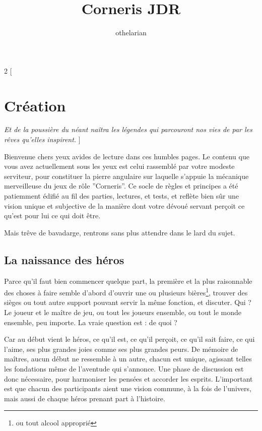 \documentclass[11pt,oneside]{book}
\title{Corneris JDR}
\author{othelarian}
\date{}
\begin{document}
\maketitle

\tableofcontents

\begin{multicols}{2}
[    
    \chapter{Création}
    \emph{Et de la poussière du néant naîtra les légendes qui parcouront nos vies de par les rêves qu'elles inspirent.}
]

Bienvenue chers yeux avides de lecture dans ces humbles pages. Le contenu que vous avez actuellement sous les yeux est celui rassemblé par votre modeste serviteur, pour constituer la pierre angulaire sur laquelle s'appuie la mécanique merveilleuse du jeux de rôle ''Corneris''. Ce socle de règles et principes a été patiemment édifié au fil des parties, lectures, et tests, et reflète bien sûr une vision unique et subjective de la manière dont votre dévoué servant perçoit ce qu'est pour lui ce qui doit être.

Mais trêve de bavadarge, rentrons sans plus attendre dans le lard du sujet.

\section{La naissance des héros}

Parce qu'il faut bien commencer quelque part, la première et la plus raisonnable des choses à faire semble d'abord d'ouvrir une ou plusieurs bières\footnote{ou tout alcool approprié}, trouver des sièges ou tout autre support pouvant servir la même fonction, et discuter. Qui ? Le joueur et le maître de jeu, ou tout les joueurs ensemble, ou tout le monde ensemble, peu importe. La vraie question est : de quoi ?

Car au début vient le héros, ce qu'il est, ce qu'il perçoit, ce qu'il sait faire, ce qui l'aime, ses plus grandes joies comme ses plus grandes peurs. De mémoire de maîtres, aucun début ne ressemble à un autre, chacun est unique, agissant telles les fondations même de l'aventude qui s'annonce. Une phase de discussion est donc nécessaire, pour harmoniser les pensées et accorder les esprits. L'important est que chacun des participants aient une vision commune, à la fois de l'univers, mais aussi de chaque héros prenant part à l'histoire.


\end{multicols}
\end{document}
